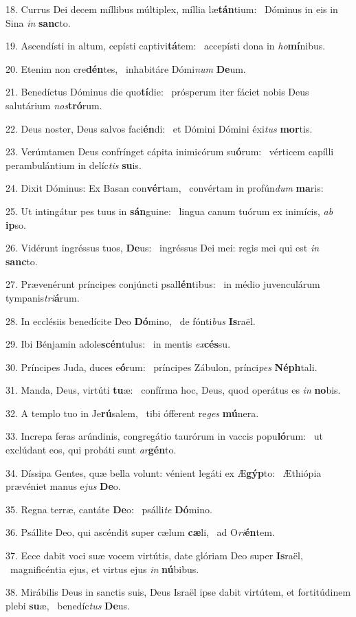 18. Currus Dei decem míllibus múltiplex, míllia læ\textbf{tán}tium: \ast\  Dóminus in eis in Sina \textit{in} \textbf{sanc}to.\

19. Ascendísti in altum, cepísti captivi\textbf{tá}tem: \ast\  accepísti dona in \textit{ho}\textbf{mí}nibus.\

20. Etenim non cre\textbf{dén}tes, \ast\  inhabitáre Dómi\textit{num} \textbf{De}um.\

21. Benedíctus Dóminus die quo\textbf{tí}die: \ast\  prósperum iter fáciet nobis Deus salutárium \textit{nos}\textbf{tró}rum.\

22. Deus noster, Deus salvos faci\textbf{én}di: \ast\  et Dómini Dómini éxi\textit{tus} \textbf{mor}tis.\

23. Verúmtamen Deus confrínget cápita inimicórum su\textbf{ó}rum: \ast\  vérticem capílli perambulántium in delíc\textit{tis} \textbf{su}is.\

24. Dixit Dóminus: Ex Basan con\textbf{vér}tam, \ast\  convértam in profún\textit{dum} \textbf{ma}ris:\

25. Ut intingátur pes tuus in \textbf{sán}guine: \ast\  lingua canum tuórum ex inimícis, \textit{ab} \textbf{ip}so.\

26. Vidérunt ingréssus tuos, \textbf{De}us: \ast\  ingréssus Dei mei: regis mei qui est \textit{in} \textbf{sanc}to.\

27. Prævenérunt príncipes conjúncti psal\textbf{lén}tibus: \ast\  in médio juvenculárum tympanis\textit{tri}\textbf{á}rum.\

28. In ecclésiis benedícite Deo \textbf{Dó}mino, \ast\  de fónti\textit{bus} \textbf{Is}raël.\

29. Ibi Bénjamin adole\textbf{scén}tulus: \ast\  in mentis \textit{ex}\textbf{cés}su.\

30. Príncipes Juda, duces e\textbf{ó}rum: \ast\  príncipes Zábulon, prínci\textit{pes} \textbf{Néph}tali.\

31. Manda, Deus, virtúti \textbf{tu}æ: \ast\  confírma hoc, Deus, quod operátus es \textit{in} \textbf{no}bis.\

32. A templo tuo in Je\textbf{rú}salem, \ast\  tibi ófferent re\textit{ges} \textbf{mú}nera.\

33. Increpa feras arúndinis, congregátio taurórum in vaccis popu\textbf{ló}rum: \ast\  ut exclúdant eos, qui probáti sunt \textit{ar}\textbf{gén}to.\

34. Díssipa Gentes, quæ bella volunt: vénient legáti ex Æ\textbf{gýp}to: \ast\  Æthiópia prævéniet manus e\textit{jus} \textbf{De}o.\

35. Regna terræ, cantáte \textbf{De}o: \ast\  psálli\textit{te} \textbf{Dó}mino.\

36. Psállite Deo, qui ascéndit super cælum \textbf{cæ}li, \ast\  ad O\textit{ri}\textbf{én}tem.\

37. Ecce dabit voci suæ vocem virtútis, date glóriam Deo super \textbf{Is}raël, \ast\  magnificéntia ejus, et virtus ejus \textit{in} \textbf{nú}bibus.\

38. Mirábilis Deus in sanctis suis, Deus Israël ipse dabit virtútem, et fortitúdinem plebi \textbf{su}æ, \ast\  benedíc\textit{tus} \textbf{De}us.\

